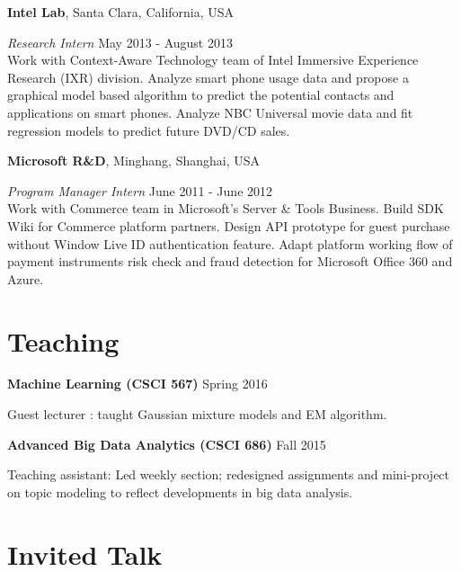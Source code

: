 \documentclass[margin,line]{res}
\begin{document}
\begin{resume}
{\bf  Intel Lab}, Santa Clara, California, USA

\vspace{-.3cm}
{\em Research Intern} \hfill{May 2013 - August 2013}\\ %
Work with Context-Aware Technology team of Intel Immersive Experience Research (IXR) division. 
Analyze smart phone usage data and propose a graphical model based algorithm to predict the potential contacts and applications on smart phones.
Analyze NBC Universal movie data and fit regression models to predict future DVD/CD sales.

{\bf  Microsoft R\&D}, Minghang, Shanghai, USA

\vspace{-.3cm}
{\em Program Manager Intern} \hfill {June  2011 
- June  2012}\\
 Work with Commerce team in Microsoft’s Server \& Tools Business.
 Build SDK Wiki for Commerce platform partners.  
 Design API prototype for guest purchase without Window Live ID authentication feature.
Adapt platform working flow of payment instruments risk check and fraud detection for Microsoft Office 360 and Azure.


\section{\sc Teaching }
 {\bf Machine Learning (CSCI 567)}   \hfill  { Spring 2016 } 
 
 \vspace{-.3cm}
 Guest  lecturer : taught Gaussian mixture models and EM algorithm.
 
 
 {\bf Advanced Big Data Analytics (CSCI 686)}   \hfill  {Fall 2015} 
 
 \vspace{-.3cm}
Teaching assistant: Led weekly section; redesigned assignments and mini-project on topic modeling to reflect developments in big data analysis. 


\section{\sc Invited Talk}


\end{resume}
\end{document}
